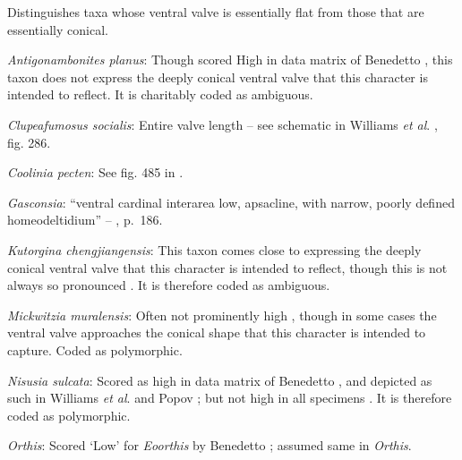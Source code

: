 \documentclass[openany]{book}
\theoremstyle{definition}
\theoremstyle{definition}
\theoremstyle{definition}
\theoremstyle{remark}
\begin{document}
Distinguishes taxa whose ventral valve is essentially flat from those
that are essentially conical.

\hypertarget{Antigonambonites_planus-coding-105}{}
\emph{Antigonambonites planus}: Though scored High in data matrix of
Benedetto \citeyearpar{Benedetto2009iChaniella}, this taxon
\citep[see][fig. 508]{Williams2000LinguliformeaCraniiformea} does not
express the deeply conical ventral valve that this character is intended
to reflect. It is charitably coded as ambiguous.

\hypertarget{Clupeafumosus_socialis-coding-105}{}
\emph{Clupeafumosus socialis}: Entire valve length -- see schematic in
Williams \emph{et al}. \citeyearpar{Williams1997Introduction}, fig. 286.

\hypertarget{Coolinia_pecten-coding-105}{}
\emph{Coolinia pecten}: See fig. 485 in
\citet{Williams2000LinguliformeaCraniiformea}.

\hypertarget{Gasconsia-coding-105}{}
\emph{Gasconsia}: ``ventral cardinal interarea low, apsacline, with
narrow, poorly defined homeodeltidium'' --
\citet{Williams2000LinguliformeaCraniiformea}, p.~186.

\hypertarget{Kutorgina_chengjiangensis-coding-105}{}
\emph{Kutorgina chengjiangensis}: This taxon
\citetext{\citealp[see][fig.
129]{Williams2000LinguliformeaCraniiformea}; \citealp[fig.
1]{Popov1992TheCambrian}} comes close to expressing the deeply conical
ventral valve that this character is intended to reflect, though this is
not always so pronounced \citep[e.g.][fig.
125]{Williams2000LinguliformeaCraniiformea}. It is therefore coded as
ambiguous.

\hypertarget{Mickwitzia_muralensis-coding-105}{}
\emph{Mickwitzia muralensis}: Often not prominently high
\citep{Skovsted2003EarlyCambrian, Balthasar2004Shellstructure}, though
in some cases \citep[e.g.][]{Butler2015Exceptionallypreserved} the
ventral valve approaches the conical shape that this character is
intended to capture. Coded as polymorphic.

\hypertarget{Nisusia_sulcata-coding-105}{}
\emph{Nisusia sulcata}: Scored as high in data matrix of Benedetto
\citeyearpar{Benedetto2009iChaniella}, and depicted as such in Williams
\emph{et al}. \citeyearpar[fig.
125]{Williams2000LinguliformeaCraniiformea} and Popov \citeyearpar[fig.
1]{Popov1992TheCambrian}; but not high in all specimens
\citep[e.g.][fig. 126]{Williams2000LinguliformeaCraniiformea}. It is
therefore coded as polymorphic.

\hypertarget{Orthis-coding-105}{}
\emph{Orthis}: Scored `Low' for \emph{Eoorthis} by Benedetto
\citeyearpar{Benedetto2009iChaniella}; assumed same in \emph{Orthis}.
\end{document}
